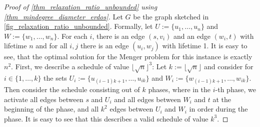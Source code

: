 \documentclass[10pt,a4paper]{article}
\numberwithin{equation}{section}
\newcommand{\set}[1]{\{ #1 \}}
\newcommand{\fromto}[2]{\set{#1, \ldots, #2}}
\begin{document}
\begin{proof}[Proof of \cref{thm_relaxation_ratio_unbounded} using \cref{thm_mindegree_diameter_erdos}]
Let $G$ be the graph sketched in \cref{fig_relaxation_ratio_unbounded}. Formally,  let $U := \fromto{u_1}{u_n}$ and $W := \fromto{w_1}{w_n}$. For each $i$, there is an edge $(s,v_i)$ and  an edge $(w_i, t)$ with lifetime $n$ and for all $i, j$ there is an edge $(u_i, w_j)$ with lifetime 1. It is easy to see, that the optimal solution for the Menger problem for this instance is exactly $n^2$.
 First, we describe a schedule of value $\lfloor \sqrt{n} \rfloor^3$: Let $k := \lfloor \sqrt{n} \rfloor$ and consider for $i \in \fromto{1}{k}$ the sets $U_i := \fromto{u_{(i-1)k+1}}{u_{ik}}$ and $W_i := \fromto{w_{(i-1)k+1}}{w_{ik}}$. Then consider the schedule consisting out of $k$ phases, where in the $i$-th phase, we activate all edges between $s$ and $U_i$ and all edges between $W_i$ and $t$ at the beginning of the phase, and all $k^2$ edges between $U_i$ and $W_i$ in order during the phase. It is easy to see that this describes a valid schedule of value $k^3$.
 

\end{proof}
\end{document}
